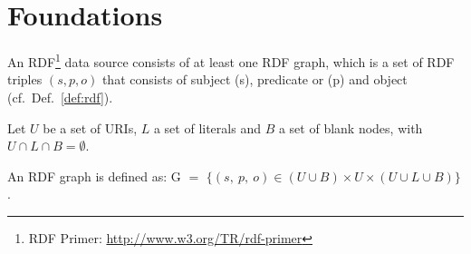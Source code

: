 \documentclass{llncs} %
\newcommand{\ggr}[1]{} %
\begin{document}
%
%
%
%
%



\section{Foundations}


An RDF\footnote{RDF Primer: \url{http://www.w3.org/TR/rdf-primer}} data source consists of at least one RDF graph, which is a set of RDF triples $(s, p, o)$
that consists of subject (s), predicate or (p)  and object (cf.~Def.~\ref{def:rdf}).

\begin{definition}
\label{def:rdf}
Let $U$ be a set of URIs, $L$  a set of literals and $B$ a set of blank nodes,
with $U \cap L \cap B = \emptyset$.

An RDF graph is defined as:
$\mathrm{G}$ $=$ $\{ (s ,\ p , \ o) \in (U\cup B)\times U \times (U\cup L \cup B) \} $. 
\end{definition}
\end{document}
